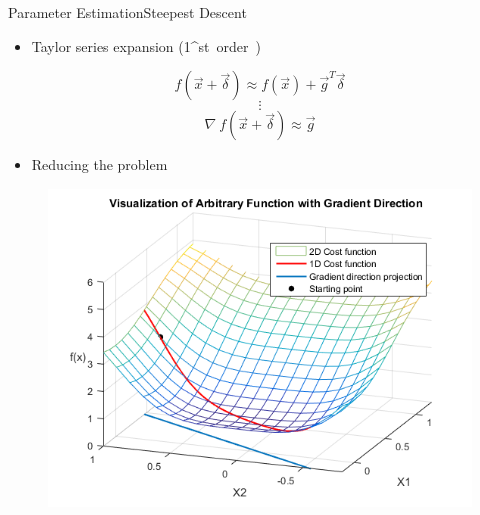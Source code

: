 \begin{frame}{Parameter Estimation}{Steepest Descent}
  \begin{itemize}
    \item Taylor series expansion (1\si{^{st}} order)
  \end{itemize}
  \begin{displaymath}
    \si{f(\vec{x}+\vec{\delta}) \approx f(\vec{x}) + \vec{g}^T \vec{\delta}}%
  \end{displaymath}
  \begin{displaymath}
    \vdots
  \end{displaymath}
  \begin{displaymath}
    \si{\nabla\ f(\vec{x}+\vec{\delta}) \approx \vec{g}}
  \end{displaymath}
  \vspace{-12pt}
  \pause
  \begin{itemize}
    \item Reducing the problem
  \end{itemize}
    \begin{minipage}{\linewidth}
    \begin{minipage}{0.45\linewidth}
      \begin{figure}[H]
        \centering
        \includegraphics[scale=0.33]{Pictures/gradientDIrection2D4.png}
      \end{figure}
    \end{minipage}
    \hspace{0.03\linewidth}
    \begin{minipage}{0.45\linewidth}

\end{minipage}
\end{minipage}
\end{frame}
